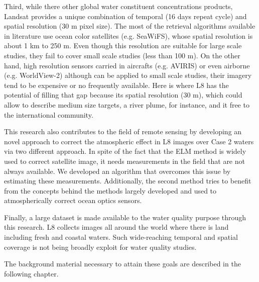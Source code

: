 Third, while there other global water constituent concentrations products, Landsat provides a unique combination of temporal (16 days repeat cycle) and spatial resolution (30 m pixel size). The most of the retrieval algorithms available in literature use ocean color satellites (e.g. SeaWiFS), whose spatial resolution is about 1 km to 250 m. Even though this resolution are suitable for large scale studies, they fail to cover small scale studies (less than 100 m). On the other hand, high resolution sensors carried in aircrafts (e.g. AVIRIS) or even airborne (e.g. WorldView-2) although can be applied to small scale studies, their imagery tend to be expensive or no frequently available. Here is where L8 has the potential of filling that gap because its spatial resolution (30 m), which could allow to describe medium size targets, a river plume, for instance, and it free to the international community.

This research also contributes to the field of remote sensing by developing an novel approach to correct the atmospheric effect in L8 images over Case 2 waters via two different approach. In spite of the fact that the ELM method is widely used to correct satellite image, it needs measurements in the field that are not always available. We developed an algorithm that overcomes this issue by estimating these measurements. Additionally, the { \color{red} second method} tries to benefit from the concepts behind the methods largely developed and used to atmospherically correct ocean optics sensors.

Finally, a large dataset is made available to the water quality purpose through this research. L8 collects images all around the world where there is land including fresh and coastal waters. Such wide-reaching temporal and spatial coverage is not being broadly exploit for water quality studies.

The background material necessary to attain these goals are described in the following chapter.
